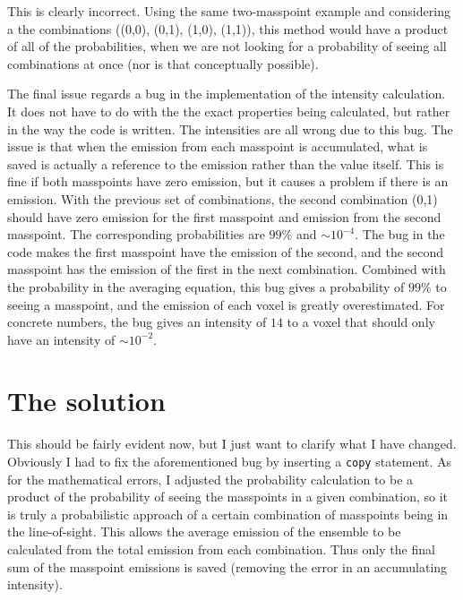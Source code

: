 \documentclass[amsmath,align]{paper}
\begin{document}
  This is clearly incorrect. Using the same two-masspoint example and considering a the combinations ((0,0), (0,1), (1,0), (1,1)), this method would have a product of all of the probabilities, when we are not looking for a probability of seeing all combinations at once (nor is that conceptually possible).
  
  The final issue regards a bug in the implementation of the intensity calculation. It does not have to do with the the exact properties being calculated, but rather in the way the code is written. The intensities are all wrong due to this bug. The issue is that when the emission from each masspoint is accumulated, what is saved is actually a reference to the emission rather than the value itself. This is fine if both masspoints have zero emission, but it causes a problem if there is an emission. With the previous set of combinations, the second combination (0,1) should have zero emission for the first masspoint and emission from the second masspoint. The corresponding probabilities are $99\%$ and $\sim10^{-4}$. The bug in the code makes the first masspoint have the emission of the second, and the second masspoint has the emission of the first in the next combination. Combined with the probability in the averaging equation, this bug gives a probability of $99\%$ to seeing a masspoint, and the emission of each voxel is greatly overestimated. For concrete numbers, the bug gives an intensity of $14$ to a voxel that should only have an intensity of $\sim 10^{-2}$.
  
  \section{The solution}
  This should be fairly evident now, but I just want to clarify what I have changed. Obviously I had to fix the aforementioned bug by inserting a \texttt{copy} statement. As for the mathematical errors, I adjusted the probability calculation to be a product of the probability of seeing the masspoints in a given combination, so it is truly a probabilistic approach of a certain combination of masspoints being in the line-of-sight. This allows the average emission of the ensemble to be calculated from the total emission from each combination. Thus only the final sum of the masspoint emissions is saved (removing the error in an accumulating intensity).
  
\end{document}
